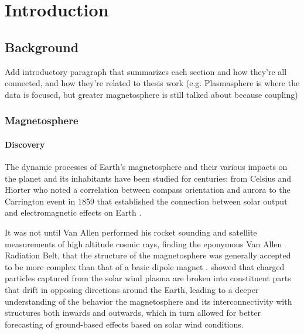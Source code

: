 
\chapter[Introduction]{Introduction}

\section{Background}

\vnote Add introductory paragraph that summarizes each section and how they're all connected, and how they're related to thesis work (e.g. Plasmasphere is where the data is focused, but greater magnetosphere is still talked about because coupling)

\subsection{Magnetosphere}

\subsubsection{Discovery}
The dynamic processes of Earth's magnetosphere and their various impacts on the planet and its inhabitants have been studied for centuries: from Celsius and Hiorter who noted a correlation between compass orientation and aurora \citep{Maunder} to the Carrington event in 1859 that established the connection between solar output and electromagnetic effects on Earth \citep{Carrington}. 

It was not until Van Allen performed his rocket sounding and satellite measurements of high altitude cosmic rays, finding the eponymous Van Allen Radiation Belt, that the structure of the magnetosphere was generally accepted to be more complex than that of a basic dipole magnet \citep{MagnetoHistory}. \cite{Gold1959RingCurrent} showed that charged particles captured from the solar wind plasma are broken into constituent parts that drift in opposing directions around the Earth, leading to a deeper understanding of the behavior the magnetosphere and its interconnectivity with structures both inwards and outwards, which in turn allowed for better forecasting of ground-based effects based on solar wind conditions.

